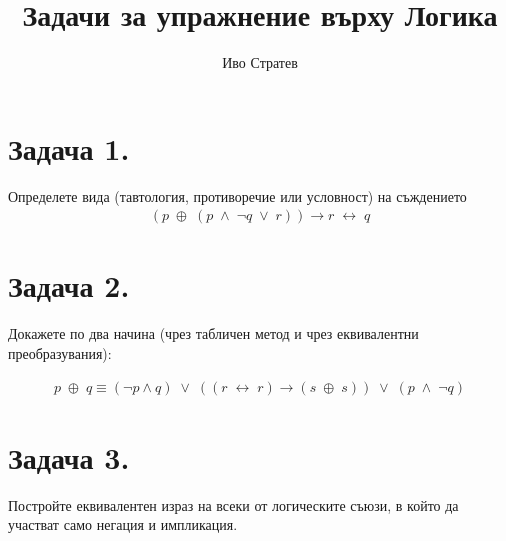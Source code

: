 \documentclass[12pt]{article}
\title{Задачи за упражнение върху Логика}
\author{Иво Стратев}
\begin{document}
\maketitle

\section*{Задача 1.}

Определете вида (тавтология, противоречие или условност) на съждението
\begin{align*}
(p \; \oplus \; (p \; \land \; \neg q \; \lor \;  r)) \to r \; \leftrightarrow \; q
\end{align*}

\section*{Задача 2.}
Докажете по два начина (чрез табличен метод и чрез еквивалентни преобразувания):

\begin{align*}
p \; \oplus \; q \equiv (\neg p \land q) \; \lor \; ((r \; \leftrightarrow \; r) \to (s \; \oplus \; s)) \; \lor \; (p \; \land \; \neg q)
\end{align*}

\section*{Задача 3.}

Постройте еквивалентен израз на всеки от логическите съюзи, в който да участват само негация и импликация.
\end{document}
